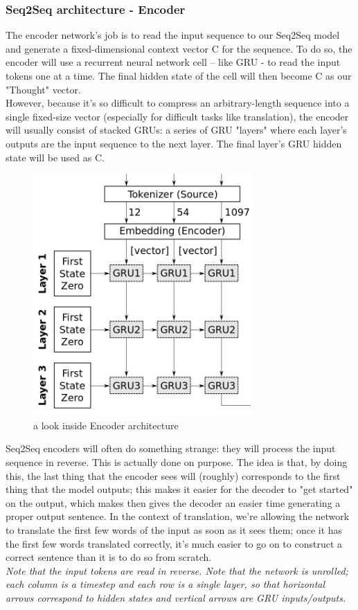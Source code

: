   \subsubsection{Seq2Seq architecture - Encoder}
  The encoder network’s job is to read the input sequence to our
Seq2Seq model and generate a fixed-dimensional context vector C
for the sequence. To do so, the encoder will use a recurrent neural
network cell – like GRU - to read the input tokens one at a time. The final hidden state of the cell will then become C as our "Thought" vector.\\
 However,
because it’s so difficult to compress an arbitrary-length sequence into
a single fixed-size vector (especially for difficult tasks like translation),
the encoder will usually consist of stacked GRUs: a series of
GRU "layers" where each layer’s outputs are the input sequence to
the next layer. The final layer’s GRU hidden state will be used as C.
 \begin{figure}[H]%
    \center%
    \includegraphics[width=.4\textwidth]{images/amir/enc.png}%
    \caption[This is a encoder image]{ a look inside Encoder architecture \cite{web018}
    }\label{fig:encoder}%
  \end{figure}
Seq2Seq encoders will often do something strange: they will process
the input sequence in reverse. This is actually done on purpose.
The idea is that, by doing this, the last thing that the encoder sees
will (roughly) corresponds to the first thing that the model outputs;
this makes it easier for the decoder to "get started" on the output,
which makes then gives the decoder an easier time generating a
proper output sentence. In the context of translation, we’re allowing
the network to translate the first few words of the input as soon as it sees them; once it has the first few words translated correctly, it’s
much easier to go on to construct a correct sentence than it is to do
so from scratch. \\
\textit{Note that the input
tokens are read in reverse. Note that the
network is unrolled; each column is a
timestep and each row is a single layer,
so that horizontal arrows correspond
to hidden states and vertical arrows are
GRU inputs/outputs.}
